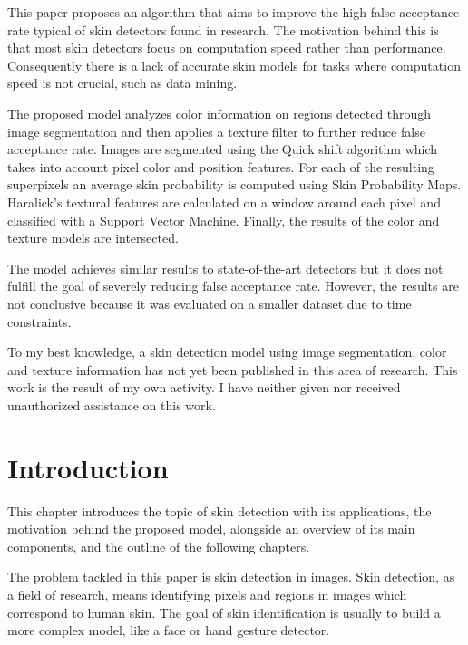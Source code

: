 \documentclass[12pt]{report}
\begin{document}
	This paper proposes an algorithm that aims to improve the high false acceptance rate typical of skin detectors found in research. The motivation behind this is that most skin detectors focus on computation speed rather than performance. Consequently there is a lack of accurate skin models for tasks where computation speed is not crucial, such as data mining.
	
	The proposed model analyzes color information on regions detected through image segmentation and then applies a texture filter to further reduce false acceptance rate. Images are segmented using the Quick shift algorithm which takes into account pixel color and position features. For each of the resulting superpixels an average skin probability is computed using Skin Probability Maps. Haralick's textural features are calculated on a window around each pixel and classified with a Support Vector Machine. Finally, the results of the color and texture models are intersected. 
	
	The model achieves similar results to state-of-the-art detectors but it does not fulfill the goal of severely reducing false acceptance rate. However, the results are not conclusive because it was evaluated on a smaller dataset due to time constraints.
	
	To my best knowledge, a skin detection model using image segmentation, color and texture information has not yet been published in this area of research. This work is the result of my own activity. I have neither given nor received unauthorized assistance on this work.
	
	
	\tableofcontents
	\listoffigures
	\listoftables
	\newpage
	
	
	\chapter{Introduction}
	
	This chapter introduces the topic of skin detection with its applications, the motivation behind the proposed model, alongside an overview of its main components, and the outline of the following chapters.
	
	The problem tackled in this paper is skin detection in images. Skin detection, as a field of research,  means identifying pixels and regions in images which correspond to human skin. The goal of skin identification is usually to build a more complex model, like a face or hand gesture detector.
	
\end{document}
